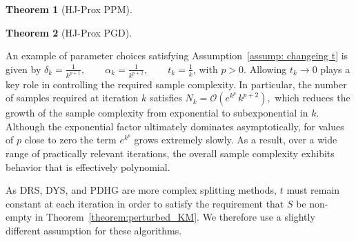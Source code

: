 \documentclass{article}
\newcommand{\prox}{\operatorname{prox}}
\newcommand{\amp}{\mathop{\:\:\,}\nolimits}
\theoremstyle{plain}
\newtheorem{theorem}{Theorem}[section]
\theoremstyle{definition}
\theoremstyle{remark}
\begin{document}
\begin{theorem}[HJ-Prox PPM]
    \label{theorem:hjppm}
\end{theorem} 
\begin{theorem}[HJ-Prox PGD]
    \label{theorem:hjpgd}
\end{theorem}
\newcommand{\drsTheorem}[1]{
Let $f,g$ be proper, convex, LSC, and $L$-Lipschitz. Consider the HJ-Prox–based DRS iteration given by  
    \begin{equation}
        \begin{split}
        x_{k+1/2} & \amp = \amp \widehat{\prox}^{\delta_k}_{tf}(z_k), \\
        x_{k+1} & \amp = \amp \widehat{\prox}^{\delta_k}_{tg}(2x_{k+1/2}-z_k), \\
        z_{k+1} & \amp = \amp z_k + x_{k+1} - x_{k+1/2},
        \end{split}
    \end{equation}
    with parameters satisfying 
the conditions of Assumption ~\ref{assump: fixed t}. Then $x_k$ converges almost surely to a minimizer of $f+g$.
}
An example of parameter choices satisfying Assumption~\ref{assump: changeing t} is given by
$\delta_k = \frac{1}{k^{p+1}}, \qquad 
\alpha_k = \frac{1}{k^{p+2}}, \qquad 
t_k = \frac{1}{k}$,
with $p>0$. Allowing $t_k \to 0$ plays a key role in controlling the required sample complexity. In particular, the number of samples required at iteration $k$ satisfies $N_k = \mathcal{O}\!\left(e^{k^p}\,k^{p+2}\right),$
which reduces the growth of the sample complexity from exponential to subexponential in \(k\). Although the exponential factor ultimately dominates asymptotically, for values of \(p\) close to zero the term \(e^{k^p}\) grows extremely slowly. As a result, over a wide range of practically relevant iterations, the overall sample complexity exhibits behavior that is effectively polynomial. 


As DRS, DYS, and PDHG are more complex splitting methods, $t$ must remain constant at each iteration in order to satisfy the requirement that $S$ be non-empty in Theorem~\ref{theorem:perturbed_KM}. We therefore use a slightly different assumption for these algorithms.
\end{document}
